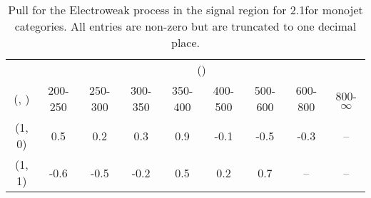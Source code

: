 \begin{table}[h!]
\tiny
\centering
\caption{Pull for the Electroweak process in the signal region for 2.1\ifb for monojet categories. All entries are non-zero but are truncated to one decimal place.\label{tab:pullsepnaive_sig_ewk_mono}}
\begin{tabular}
{ccccccccc}
	\hline\hline
	& \multicolumn{8}{c}{\scalht (\gev)} \\ 
	 (\njet,  \nb) & 200-250 & 250-300 & 300-350 & 350-400 & 400-500 & 500-600 & 600-800 & 800-$\infty$ \\ [0.8ex] 
\hline
	(1, 0) & 0.5 & 0.2 & 0.3 & 0.9 & -0.1 & -0.5 & -0.3 & -- \\[0.5ex] 
	(1, 1) & -0.6 & -0.5 & -0.2 & 0.5 & 0.2 & 0.7 & -- & -- \\[0.5ex] 
	\hline
	\hline
\end{tabular}
\end{table}
